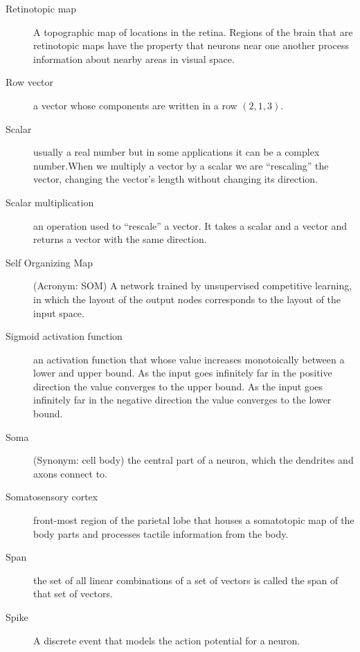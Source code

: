 \begin{description}

\item[Retinotopic map] A topographic map of locations in the retina. Regions of the brain that are retinotopic maps have the property that neurons near one another process information about nearby areas in visual space.

\item[Row vector] a vector whose components are written in a row \eg $(2,1,3)$.

\item[Scalar] usually a real number but in some applications it can be a complex number.When we multiply a vector by a scalar we are ``rescaling'' the vector, \ie changing the vector's length without changing its direction.

\item[Scalar multiplication] an operation used to ``rescale'' a vector. It takes a scalar and a vector and returns a vector with the same direction.

\item[Self Organizing Map] (Acronym: SOM)  A network trained by unsupervised competitive learning, in which the layout of the output nodes corresponds to the layout of the input space.

\item[Sigmoid activation function] an activation function that whose value increases  monotoically between a lower and upper bound. As the input goes infinitely far in the positive direction the value converges to the upper bound. As the input goes infinitely far in the negative direction the value converges to the lower bound.


\item[Soma] (Synonym: cell body) the central part of a neuron, which the dendrites and axons connect to.

\item[Somatosensory cortex] front-most region of the parietal lobe that houses a somatotopic map of the body parts and processes tactile information from the body.

\item[Span] the set of all linear combinations of a set of vectors is called the span of that set of vectors.

\item[Spike] A discrete event that models the action potential for a neuron.


\end{description}
